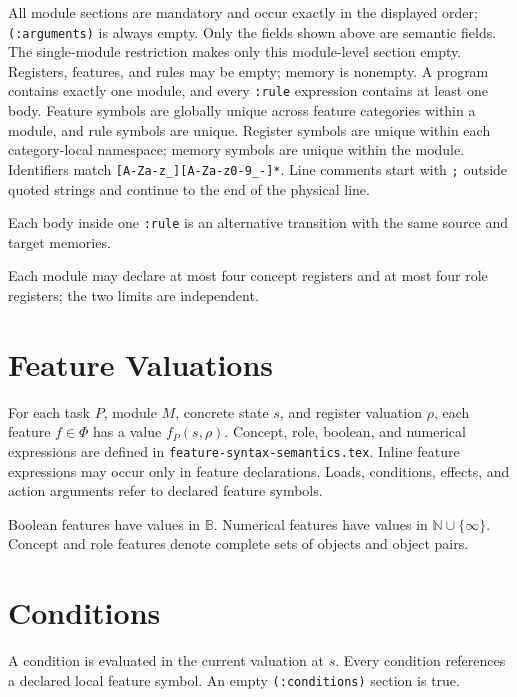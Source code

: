 \documentclass[11pt]{article}
\newcommand{\code}[1]{\texttt{#1}}
\newcommand{\unclear}[1]{\textcolor{magenta}{#1}}
\begin{document}
All module sections are mandatory and occur exactly in the displayed order;
\code{(:arguments)} is always empty. Only the fields shown above are semantic
fields.
{The single-module restriction makes only this module-level section empty.}
Registers, features, and rules may be empty; memory is nonempty.
{A program contains exactly one module,} and every \code{:rule} expression contains
at least one body. Feature symbols are globally unique across feature
categories within a module, and rule symbols are unique. Register symbols are
unique within each category-local namespace; memory symbols are unique within
the module. Identifiers
match \code{[A-Za-z_][A-Za-z0-9_-]*}. Line comments start with \code{;}
outside quoted strings and continue to the end of the physical line.

Each body inside one \code{:rule} is an alternative transition with the same
source and target memories.

Each module may declare at most four concept registers and at most four role
registers; the two limits are independent.

\section{Feature Valuations}

For each task $P$, module $M$, concrete state $s$, and register valuation
$\rho$, each feature $f\in\Phi$ has a value $f_P(s,\rho)$. Concept, role,
boolean, and numerical expressions are defined in
\texttt{feature-syntax-semantics.tex}. Inline feature expressions may occur
only in feature declarations. Loads, conditions, effects, and action arguments
refer to declared feature symbols.

Boolean features have values in $\mathbb{B}$. Numerical features have values in
$\mathbb{N}\cup\{\infty\}$. Concept and role features denote complete sets of
objects and object pairs.

\section{Conditions}

A condition is evaluated in the current valuation at $s$.
Every condition references a declared local feature symbol.
An empty \code{(:conditions)} section is true.
\end{document}
